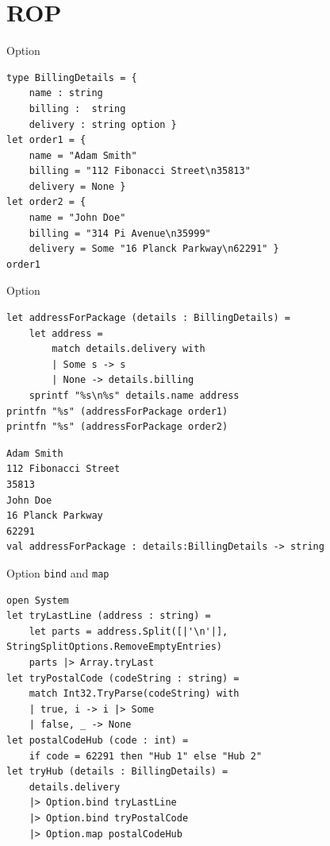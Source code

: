 \documentclass[t]{beamer}
\begin{document}
\section{ROP }
\label{sec:org65783f1}
\begin{frame}[label={sec:org66dabfa},fragile]{Option}
 \begin{verbatim}
type BillingDetails = { 
    name : string
    billing :  string
    delivery : string option }
let order1 = {
    name = "Adam Smith"
    billing = "112 Fibonacci Street\n35813" 
    delivery = None }
let order2 = {
    name = "John Doe"
    billing = "314 Pi Avenue\n35999"
    delivery = Some "16 Planck Parkway\n62291" }
order1
\end{verbatim}
\end{frame}

\begin{frame}[label={sec:orgae5a9b5},fragile]{Option}
 \begin{verbatim}
let addressForPackage (details : BillingDetails) = 
    let address =
        match details.delivery with 
        | Some s -> s
        | None -> details.billing
    sprintf "%s\n%s" details.name address
printfn "%s" (addressForPackage order1)
printfn "%s" (addressForPackage order2)
\end{verbatim}

\begin{verbatim}
Adam Smith
112 Fibonacci Street
35813
John Doe
16 Planck Parkway
62291
val addressForPackage : details:BillingDetails -> string
\end{verbatim}
\end{frame}

\begin{frame}[label={sec:orgfc60dca},fragile]{Option \texttt{bind} and \texttt{map}}
 \begin{verbatim}
open System
let tryLastLine (address : string) = 
    let parts = address.Split([|'\n'|], StringSplitOptions.RemoveEmptyEntries)
    parts |> Array.tryLast
let tryPostalCode (codeString : string) = 
    match Int32.TryParse(codeString) with 
    | true, i -> i |> Some
    | false, _ -> None
let postalCodeHub (code : int) = 
    if code = 62291 then "Hub 1" else "Hub 2"
let tryHub (details : BillingDetails) = 
    details.delivery
    |> Option.bind tryLastLine 
    |> Option.bind tryPostalCode 
    |> Option.map postalCodeHub
\end{verbatim}
\end{frame}
\end{document}
